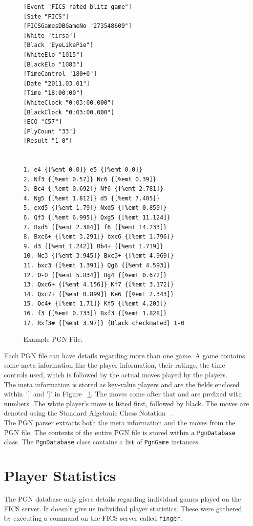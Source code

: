 \documentclass{article}
\begin{document}
\begin{figure}[tph]
\begin{center}
\begin{verbatim}
[Event "FICS rated blitz game"]
[Site "FICS"]
[FICSGamesDBGameNo "273548609"]
[White "tirsa"]
[Black "EyeLikePie"]
[WhiteElo "1015"]
[BlackElo "1083"]
[TimeControl "180+0"]
[Date "2011.03.01"]
[Time "18:00:00"]
[WhiteClock "0:03:00.000"]
[BlackClock "0:03:00.000"]
[ECO "C57"]
[PlyCount "33"]
[Result "1-0"]


1. e4 {[%emt 0.0]} e5 {[%emt 0.0]} 
2. Nf3 {[%emt 0.57]} Nc6 {[%emt 0.39]} 
3. Bc4 {[%emt 0.692]} Nf6 {[%emt 2.781]} 
4. Ng5 {[%emt 1.812]} d5 {[%emt 7.405]} 
5. exd5 {[%emt 1.79]} Nxd5 {[%emt 0.859]} 
6. Qf3 {[%emt 6.995]} Qxg5 {[%emt 11.124]} 
7. Bxd5 {[%emt 2.384]} f6 {[%emt 14.233]} 
8. Bxc6+ {[%emt 3.291]} bxc6 {[%emt 1.796]} 
9. d3 {[%emt 1.242]} Bb4+ {[%emt 1.719]} 
10. Nc3 {[%emt 3.945]} Bxc3+ {[%emt 4.969]} 
11. bxc3 {[%emt 1.391]} Qg6 {[%emt 4.593]} 
12. O-O {[%emt 5.834]} Bg4 {[%emt 0.672]} 
13. Qxc6+ {[%emt 4.156]} Kf7 {[%emt 3.172]} 
14. Qxc7+ {[%emt 0.899]} Ke6 {[%emt 2.343]} 
15. Qc4+ {[%emt 1.71]} Kf5 {[%emt 4.203]} 
16. f3 {[%emt 0.733]} Bxf3 {[%emt 1.828]} 
17. Rxf3# {[%emt 3.97]} {Black checkmated} 1-0

\end{verbatim}
\end{center}
\caption{Example PGN File.}
\label{fig:pgn}
\end{figure}

Each PGN file can have details regarding more than one game. A game contains some meta information like the player information, their ratings, the time controls used, which is followed by the actual moves played by the players.\\

The meta information is stored as key-value players and are the fields enclosed within '[' and ']' in Figure ~\ref{fig:pgn}. The moves come after that and are prefixed with numbers. The white player's move is listed first, followed by black. The moves are denoted using the Standard Algebraic Chess Notation ~\cite{wiki:san}. \\

The PGN parser extracts both the meta information and the moves from the PGN file. The contents of the entire PGN file is stored within a \verb=PgnDatabase= class. The \verb=PgnDatabase= class contains a list of \verb=PgnGame= instances.

\section{Player Statistics}
\label{sec:pstats}
The PGN database only gives details regarding individual games played on the FICS server. It doesn't give us individual player statistics. These were gathered by executing a command on the FICS server called \verb=finger=. 
\end{document}
